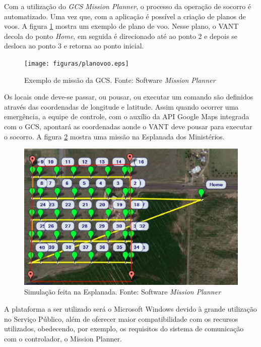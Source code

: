 Com a utilização do \textit{GCS Mission Planner}, o processo da operação de socorro é automatizado. 
Uma vez que, com a aplicação é possível a criação de planos de voos. 
A figura \ref{fig:planovoo} mostra um exemplo de plano de voo. 
Nesse plano, o VANT decola do ponto \textit{Home}, em seguida é direcionado até ao ponto 2 e depois 
se desloca ao ponto 3 e retorna ao ponto inicial.

\begin{figure}[H]
    \centering
	    \texttt{[image: figuras/planovoo.eps]}
    \caption{Exemplo de missão da GCS. Fonte: Software \textit{Mission Planner}}
    \label{fig:planovoo}
\end{figure}


Os locais onde deve-se passar, ou pousar, ou executar um comando são definidos através das coordenadas de longitude e latitude. Assim quando ocorrer uma emergência, a equipe de controle, com o auxílio da API Google Maps integrada com o GCS, apontará as coordenadas aonde o VANT deve pousar para executar o socorro. 
A figura \ref{fig:esplanada} mostra uma missão na Esplanada dos Ministérios.

\begin{figure}[H]
    \centering
	    \includegraphics[keepaspectratio=true,scale=0.8]{figuras/esplanada.eps}
    \caption{Simulação feita na Esplanada. Fonte: Software \textit{Mission Planner}}
    \label{fig:esplanada}
\end{figure}

A plataforma a ser utilizado será o Microsoft Windows devido à grande utilização no Serviço Público, 
além de oferecer maior compatibilidade com os recursos utilizados, obedecendo, por exemplo, os requisitos
do sistema de comunicação com o controlador, o Mission Planner. 

